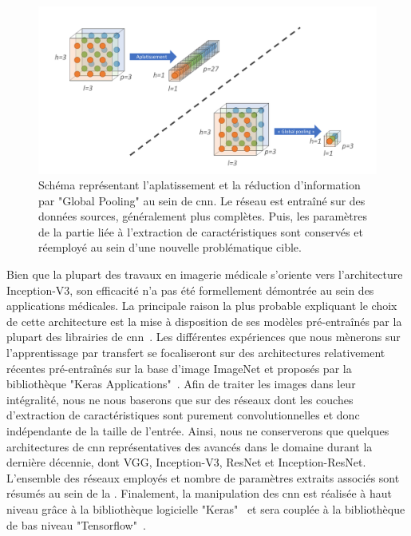 \begin{figure}[H]
    \centering
    \includegraphics[width=\linewidth]{contents/chapter_4/resources/scheme_global_pooling.pdf}
    \caption{Schéma représentant l'aplatissement et la réduction d'information par "Global Pooling" au sein de \gls{cnn}. Le réseau est entraîné sur des données sources, généralement plus complètes. Puis, les paramètres de la partie liée à l'extraction de caractéristiques sont conservés et réemployé au sein d'une nouvelle problématique cible.}
    \label{fig:scheme_global_pooling}
\end{figure}\par

Bien que la plupart des travaux en imagerie médicale s'oriente vers l'architecture Inception-V3, son efficacité n'a pas été formellement démontrée au sein des applications médicales. La principale raison la plus probable expliquant le choix de cette architecture est la mise à disposition de ses modèles pré-entraînés par la plupart des librairies de \gls{cnn}~\cite{Litjens2017}. Les différentes expériences que nous mènerons sur l'apprentissage par transfert se focaliseront sur des architectures relativement récentes pré-entraînés sur la base d'image ImageNet et proposés par la bibliothèque "Keras Applications"~\cite{chollet2015a}. Afin de traiter les images dans leur intégralité, nous ne nous baserons que sur des réseaux dont les couches d'extraction de caractéristiques sont purement convolutionnelles et donc indépendante de la taille de l'entrée. Ainsi, nous ne conserverons que quelques architectures de \gls{cnn} représentatives des avancés dans le domaine durant la dernière décennie, dont VGG, Inception-V3, ResNet et Inception-ResNet. L'ensemble des réseaux employés et nombre de paramètres extraits associés sont résumés au sein de la . Finalement, la manipulation des \ac{cnn} est réalisée à haut niveau grâce à la bibliothèque logicielle "Keras"~\cite{chollet2015} et sera couplée à la bibliothèque de bas niveau "Tensorflow"~\cite{tensorflow2015}.\par

